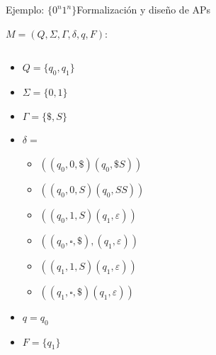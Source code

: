\documentclass[spanish, handout]{beamer}
\begin{document}
\begin{frame}{Ejemplo: $\{0^n1^n\}$}{Formalización y diseño de APs}

    $M = (Q, \Sigma, \Gamma, \delta, q, F)$:

    \begin{columns}
        \begin{column}{0.4\textwidth}
            \begin{itemize}
                \item $Q = \{q_0, q_1\}$
                \item $\Sigma = \{0, 1\}$
                \item $\Gamma = \{\$, S\}$
                \item $\delta =$
                \begin{itemize}
                    \item $((q_0,0,\$)(q_0,\$S))$
                    \item $((q_0,0,S)(q_0,SS))$
                    \item $((q_0,1,S)(q_1,\varepsilon))$
                    \item $((q_0,\square,\$),(q_1,\varepsilon))$
                    \item $((q_1,1,S)(q_1,\varepsilon))$
                    \item $((q_1,\square,\$)(q_1,\varepsilon))$
                \end{itemize}
                \item $q = q_0$
                \item $F = \{q_1\}$
            \end{itemize}
        \end{column}
        \begin{column}{0.6\textwidth}
        \end{column}
    \end{columns}
\end{frame}
\end{document}
